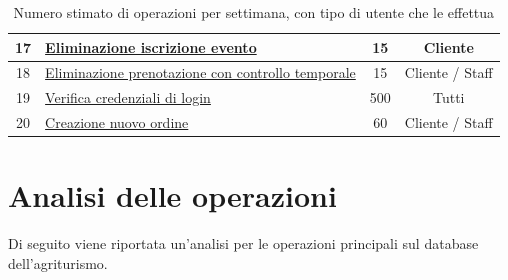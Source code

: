 \documentclass[a4paper,12pt]{report}
\begin{document}
\begin{table}[H]
\begin{tabularx}{\textwidth}{|c|>{\raggedright\arraybackslash}X|c|c|}
    \hline
    17 & \hyperref[op17]{Eliminazione iscrizione evento} & 15 & Cliente \\
    \hline
    18 & \hyperref[op18]{Eliminazione prenotazione con controllo temporale} & 15 & Cliente / Staff \\
    \hline
    19 & \hyperref[op19]{Verifica credenziali di login} & 500 & Tutti \\
    \hline
    20 & \hyperref[op20]{Creazione nuovo ordine} & 60 & Cliente / Staff \\
    \hline
  \end{tabularx}
  \caption{Numero stimato di operazioni per settimana, con tipo di utente che le effettua}
  \label{tab:operazioni-settimanali}
\end{table}

\section{Analisi delle operazioni}
Di seguito viene riportata un'analisi per le operazioni principali sul database dell'agriturismo.
\end{document}
